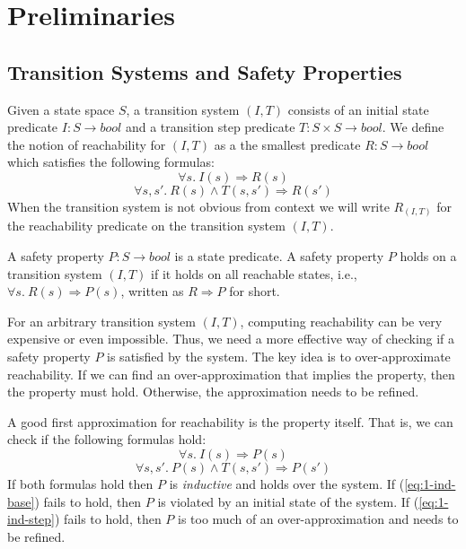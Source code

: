 \section{Preliminaries}
\label{sec:background}

\newcommand{\bool}[0]{\mathit{bool}}
\newcommand{\reach}[0]{\mathit{R}}
\newcommand{\ite}[3]{\mathit{if}\ #1\ \mathit{then}\ #2\ \mathit{else}\ #3}

\subsection{Transition Systems and Safety Properties}

Given a state space $S$, a transition system $(I,T)$ consists of an
initial state predicate $I : S \to \bool$ and a transition step
predicate $T : S \times S \to \bool$. We define the notion of
reachability for $(I, T)$ as a the smallest predicate $\reach : S \to
\bool$ which satisfies the following formulas:
\begin{equation*}
  \forall s.~ I(s) \Rightarrow \reach(s)
\end{equation*}
\begin{equation*}
  \forall s, s'.~ \reach(s) \land T(s, s') \Rightarrow \reach(s')
\end{equation*}
When the transition system is not obvious from context we will write
$\reach_{(I,T)}$ for the reachability predicate on the transition
system $(I,T)$.

A safety property $P : S \to \bool$ is a state predicate. A safety
property $P$ holds on a transition system $(I, T)$ if it holds on all
reachable states, i.e., $\forall s.~ \reach(s) \Rightarrow P(s)$,
written as $\reach \Rightarrow P$ for short.

For an arbitrary transition system $(I, T)$, computing reachability
can be very expensive or even impossible. Thus, we need a more
effective way of checking if a safety property $P$ is satisfied by the
system. The key idea is to over-approximate reachability. If we can
find an over-approximation that implies the property, then the
property must hold. Otherwise, the approximation needs to be refined.

A good first approximation for reachability is the property itself.
That is, we can check if the following formulas hold:
\begin{equation}
  \forall s.~ I(s) \Rightarrow P(s)
  \label{eq:1-ind-base}
\end{equation}
\begin{equation}
  \forall s, s'.~ P(s) \land T(s, s') \Rightarrow P(s')
  \label{eq:1-ind-step}
\end{equation}
If both formulas hold then $P$ is {\em inductive} and holds over the
system. If (\ref{eq:1-ind-base}) fails to hold, then $P$ is violated
by an initial state of the system. If (\ref{eq:1-ind-step}) fails to
hold, then $P$ is too much of an over-approximation and needs to be
refined.

